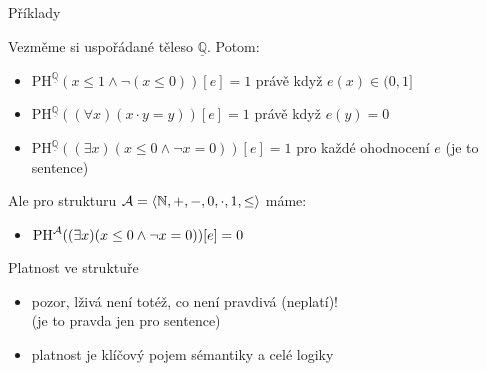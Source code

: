 \documentclass{beamer}
\begin{document}
\begin{frame}{Příklady}
    
    Vezměme si uspořádané těleso $\underline{\mathbb Q}$. Potom:
    \begin{itemize}
        \item $\mathrm{PH}^{\underline{\mathbb Q}}(x\leq 1 \land \neg (x\leq 0))[e]=1$ právě když $e(x)\in (0,1]$
        \item $\mathrm{PH}^{\underline{\mathbb Q}}((\forall x)(x\cdot y = y))[e]=1$ právě když $e(y)=0$
        \item $\mathrm{PH}^{\underline{\mathbb Q}}((\exists x)(x \leq 0 \land \neg x=0))[e]=1$ pro každé ohodnocení $e$ (je to sentence)
    \end{itemize}   
    Ale pro strukturu $\mathcal{A}=\langle \mathbb N,+,-,0,\cdot,1,\leq\rangle$ máme: 
    \begin{itemize}
        \item $\mathrm{PH}^{\mathcal{A}}((\exists x)(x \leq 0 \land \neg x=0))[e]=0$ 
    \end{itemize}     

\end{frame}


\begin{frame}{Platnost ve struktuře}
    
    
    \begin{itemize}
        \item pozor, \alert{lživá} není totéž, co \alert{není pravdivá} (\alert{neplatí})! \\(je to pravda jen pro sentence)
        \item \alert{platnost} je klíčový pojem sémantiky a celé logiky
    \end{itemize}
    
\end{frame}
\end{document}
